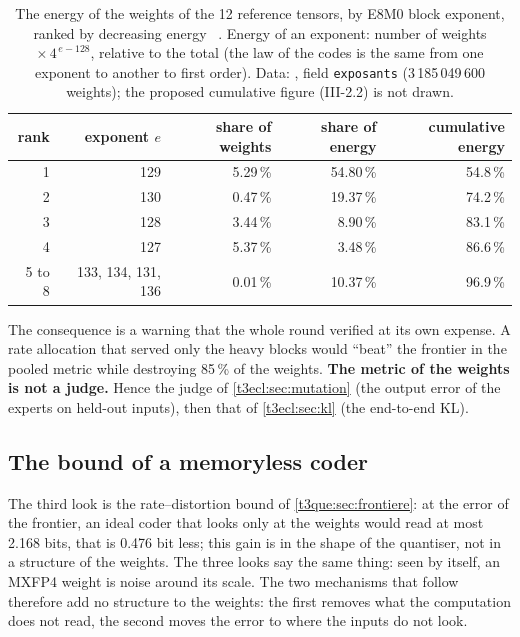 \begin{table}[tbp]
\centering\small
\begin{tabular}{r r r r r}
\toprule
rank & exponent $e$ & share of weights & share of energy & cumulative energy \\
\midrule
1 & 129 & 5.29\,\% & 54.80\,\% & 54.8\,\% \\
2 & 130 & 0.47\,\% & 19.37\,\% & 74.2\,\% \\
3 & 128 & 3.44\,\% & 8.90\,\% & 83.1\,\% \\
4 & 127 & 5.37\,\% & 3.48\,\% & 86.6\,\% \\
5 to 8 & 133, 134, 131, 136 & 0.01\,\% & 10.37\,\% & 96.9\,\% \\
\bottomrule
\end{tabular}
\caption[The energy of the weights by block exponent]{The energy of the weights of the 12 reference tensors, by E8M0 block exponent, ranked by decreasing energy \mes~\calc. Energy of an exponent: number of weights $\times\, 4^{\,e-128}$, relative to the total (the law of the codes is the same from one exponent to another to first order). Data: , field \texttt{exposants} (3\,185\,049\,600 weights); the proposed cumulative figure (III-2.2) is not drawn.}
\label{t3ecl:tab:exposants}
\end{table}

The consequence is a warning that the whole round verified at its own expense. A rate allocation that served only the heavy blocks would ``beat'' the frontier in the pooled metric while destroying 85\,\% of the weights. \textbf{The metric of the weights is not a judge.} Hence the judge of \cref{t3ecl:sec:mutation} (the output error of the experts on held-out inputs), then that of \cref{t3ecl:sec:kl} (the end-to-end KL).

\subsection{The bound of a memoryless coder}

The third look is the rate--distortion bound of \cref{t3que:sec:frontiere}: at the error of the frontier, an ideal coder that looks only at the weights would read at most 2.168 bits, that is 0.476 bit less; this gain is in the shape of the quantiser, not in a structure of the weights. The three looks say the same thing: seen by itself, an MXFP4 weight is noise around its scale. The two mechanisms that follow therefore add no structure to the weights: the first removes what the computation does not read, the second moves the error to where the inputs do not look.

